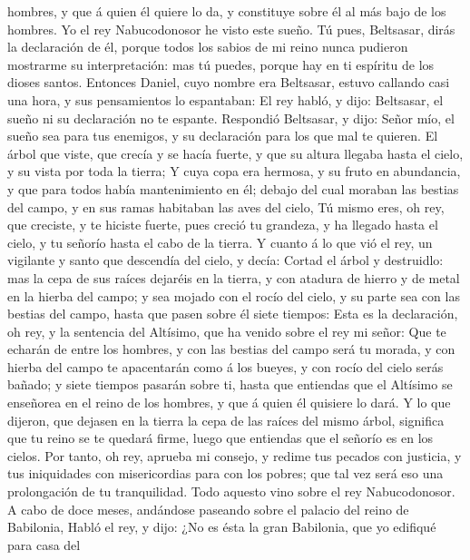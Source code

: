 hombres, y que á quien él quiere lo da, y constituye sobre él al más
bajo de los hombres.  Yo el rey Nabucodonosor he visto
este sueño. Tú pues, Beltsasar, dirás la declaración de él, porque todos
los sabios de mi reino nunca pudieron mostrarme su interpretación: mas
tú puedes, porque hay en ti espíritu de los dioses santos.
 Entonces Daniel, cuyo nombre era Beltsasar, estuvo
callando casi una hora, y sus pensamientos lo espantaban: El rey habló,
y dijo: Beltsasar, el sueño ni su declaración no te espante. Respondió
Beltsasar, y dijo: Señor mío, el sueño sea para tus enemigos, y su
declaración para los que mal te quieren.  El árbol que
viste, que crecía y se hacía fuerte, y que su altura llegaba hasta el
cielo, y su vista por toda la tierra;  Y cuya copa era
hermosa, y su fruto en abundancia, y que para todos había mantenimiento
en él; debajo del cual moraban las bestias del campo, y en sus ramas
habitaban las aves del cielo,  Tú mismo eres, oh rey, que
creciste, y te hiciste fuerte, pues creció tu grandeza, y ha llegado
hasta el cielo, y tu señorío hasta el cabo de la tierra. 
Y cuanto á lo que vió el rey, un vigilante y santo que descendía del
cielo, y decía: Cortad el árbol y destruidlo: mas la cepa de sus raíces
dejaréis en la tierra, y con atadura de hierro y de metal en la hierba
del campo; y sea mojado con el rocío del cielo, y su parte sea con las
bestias del campo, hasta que pasen sobre él siete tiempos:
 Esta es la declaración, oh rey, y la sentencia del
Altísimo, que ha venido sobre el rey mi señor:  Que te
echarán de entre los hombres, y con las bestias del campo será tu
morada, y con hierba del campo te apacentarán como á los bueyes, y con
rocío del cielo serás bañado; y siete tiempos pasarán sobre ti, hasta
que entiendas que el Altísimo se enseñorea en el reino de los hombres, y
que á quien él quisiere lo dará.  Y lo que dijeron, que
dejasen en la tierra la cepa de las raíces del mismo árbol, significa
que tu reino se te quedará firme, luego que entiendas que el señorío es
en los cielos.  Por tanto, oh rey, aprueba mi consejo, y
redime tus pecados con justicia, y tus iniquidades con misericordias
para con los pobres; que tal vez será eso una prolongación de tu
tranquilidad.  Todo aquesto vino sobre el rey
Nabucodonosor.  A cabo de doce meses, andándose paseando
sobre el palacio del reino de Babilonia,  Habló el rey, y
dijo: ¿No es ésta la gran Babilonia, que yo edifiqué para casa del
